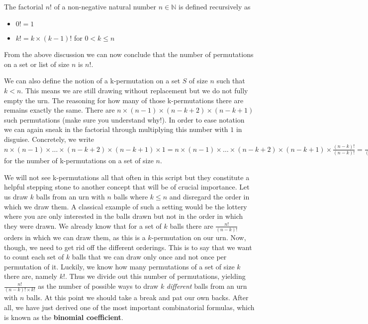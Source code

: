 \begin{Definition} The factorial $ n! $ of a non-negative natural number $ n \in \mathbb{N} $ is defined recursively as 
\begin{itemize}
\item $ 0! = 1 $
\item $ k! = k\times (k-1)! $ for $ 0 < k \leq n $
\end{itemize}
\end{Definition}

From the above discussion we can now conclude that the number of permutations on a set or list of size $ n $
is $ n! $. 

We can also define the notion of a k-permutation on a set $ S $ of size $ n $ such that $ k < n $.
This means we are still drawing without replacement but we do not fully empty the urn. The reasoning for how
many of those k-permutations there are remains exactly the same. There are $ n \times (n-1) \times (n-k+2) 
\times (n-k+1) $ such permutations (make sure you understand why!). In order to ease notation we can again
sneak in the factorial through multiplying this number with $ 1 $ in disguise. Concretely, we write
$ n \times (n-1) \times \ldots \times (n-k+2) \times (n-k+1) \times 1 = n \times (n-1) \times \ldots \times (n-k+2) \times (n-k+1) \times 
\frac{(n-k)!}{(n-k)!}
= \frac{n!}{(n-k)!} $ for the number of k-permutations on a set of size $ n $.

We will not see k-permutations all that often in this script but they constitute a helpful stepping stone to another
concept that will be of crucial importance. Let us draw $ k $ balls from an urn with $ n $ balls where $ k \leq n $ and disregard
the order in which we draw them. A classical example of such a setting would be the lottery where you are only interested in the
balls drawn but not in the order in which they were drawn. We already know that for a set of $ k $ balls there are $ \frac{n!}{(n-k)!} $ 
orders in which we can draw them, as this is a $ k $-permutation on our urn. Now, though, we need to get rid off the different 
orderings. This is to say that we want to count each set of $ k $ balls that we can draw only once and not once per permutation of it.
Luckily, we know how many permutations of a set of size $ k $ there are, namely $ k! $. Thus we divide out this number of permutations,
yielding $ \frac{n!}{(n-k)!\times k!} $ as the number of possible ways to draw $ k $ \textit{different} balls from an urn with $ n $
balls.
At this point we should take a break and pat our own backs. After all, we have just derived one of the most important combinatorial 
formulas, which is known as the \textbf{binomial coefficient}.


